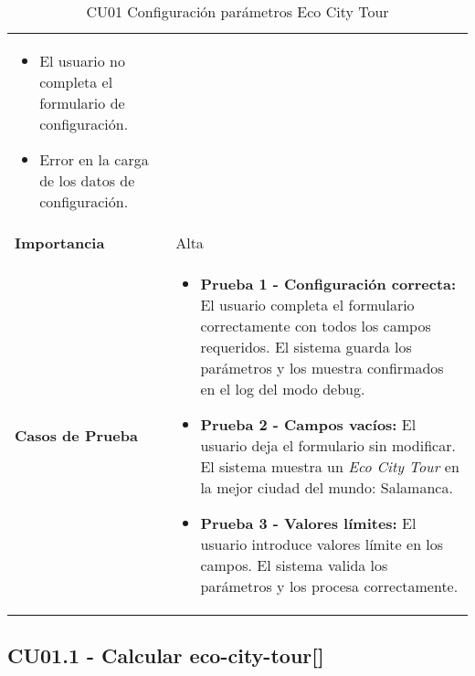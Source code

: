 \begin{table}[H]
\begin{tabularx}{\linewidth}{ p{} p{} }
\begin{itemize}
			\tightlist
			\item El usuario no completa el formulario de configuración.
			\item Error en la carga de los datos de configuración.
		\end{itemize}\\
		\textbf{Importancia}          & Alta \\
		\textbf{Casos de Prueba}      &
		\begin{itemize}
			\item \textbf{Prueba 1 - Configuración correcta:} El usuario completa el formulario correctamente con todos los campos requeridos. El sistema guarda los parámetros y los muestra confirmados en el log del modo debug.
			\vspace{2pt}
			\item \textbf{Prueba 2 - Campos vacíos:} El usuario deja el formulario sin modificar. El sistema muestra un \textit{Eco City Tour} en la mejor ciudad del mundo: Salamanca.
			\vspace{2pt}
			\item \textbf{Prueba 3 - Valores límites:} El usuario introduce valores límite en los campos. El sistema valida los parámetros y los procesa correctamente.
		\end{itemize} \\
		\bottomrule
	\end{tabularx}
	\caption{CU01 Configuración parámetros Eco City Tour}
	\label{cu:config-parametros}
\end{table}


\subsection{CU01.1 - Calcular \gls{eco-city-tour}[]}

